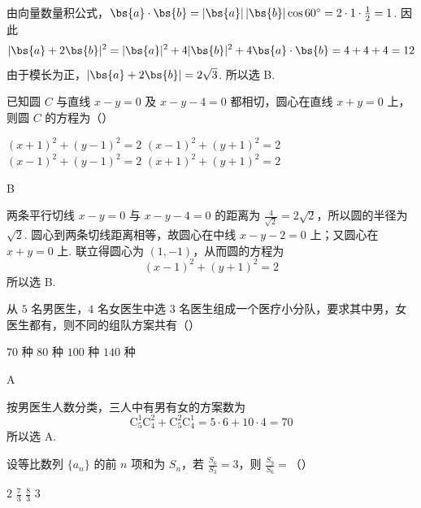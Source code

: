 \begin{solution}
由向量数量积公式，\(\bs{a}\cdot\bs{b}=|\bs{a}|\,|\bs{b}|\cos60^{\circ}=2\cdot1\cdot\frac12=1\). 因此
\[
|\bs{a}+2\bs{b}|^2=|\bs{a}|^2+4|\bs{b}|^2+4\bs{a}\cdot\bs{b}=4+4+4=12
\]
由于模长为正，\(|\bs{a}+2\bs{b}|=2\sqrt{3}\). 所以选 B.
\end{solution}

\begin{problem}
已知圆 \(C\) 与直线 \(x - y = 0\) 及 \(x - y - 4 = 0\) 都相切，圆心在直线 \(x + y = 0\) 上，则圆 \(C\) 的方程为（\quad）

\choices
    {\((x + 1)^2 +(y - 1)^2 = 2\)}
    {\((x - 1)^2 +(y + 1)^2 = 2\)}
    {\((x - 1)^2 +(y - 1)^2 = 2\)}
    {\((x + 1)^2 +(y + 1)^2 = 2\)}
\end{problem}

\begin{answer}
B
\end{answer}

\begin{solution}
两条平行切线 \(x-y=0\) 与 \(x-y-4=0\) 的距离为 \(\frac{4}{\sqrt2}=2\sqrt2\)，所以圆的半径为 \(\sqrt2\). 圆心到两条切线距离相等，故圆心在中线 \(x-y-2=0\) 上；又圆心在 \(x+y=0\) 上. 联立得圆心为 \((1,-1)\)，从而圆的方程为
\[
(x-1)^2+(y+1)^2=2
\]
所以选 B.
\end{solution}

\begin{problem}
从 \(5\) 名男医生，\(4\) 名女医生中选 \(3\) 名医生组成一个医疗小分队，要求其中男，女医生都有，则不同的组队方案共有（\quad）

\choices
    {\(70\) 种}
    {\(80\) 种}
    {\(100\) 种}
    {\(140\) 种}
\end{problem}

\begin{answer}
A
\end{answer}

\begin{solution}
按男医生人数分类，三人中有男有女的方案数为
\[
\mathrm C_5^1\mathrm C_4^2+\mathrm C_5^2\mathrm C_4^1=5\cdot6+10\cdot4=70
\]
所以选 A.
\end{solution}

\begin{problem}
设等比数列 \(\{a_{n}\}\) 的前 \(n\) 项和为 \(S_{n}\)，若 \(\frac{S_{6}}{S_{3}} = 3\)，则 \(\frac{S_{9}}{S_{6}} =\)（\quad）

\choices
    {\(2\)}
    {\( \frac{7}{3} \)}
    {\( \frac{8}{3} \)}
    {\(3\)}
\end{problem}

